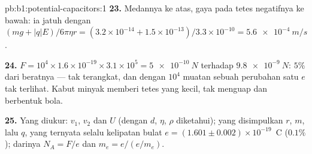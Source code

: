 \begin{solution}{pb:b1:potential-capacitors:1}
\textbf{23.} Medannya ke atas, gaya pada tetes negatifnya ke bawah: ia jatuh dengan $(mg
+ |q|E)/6\pi\eta r = (3.2 \times 10^{-14} + 1.5 \times 10^{-13})/3.3 \times 10^{-10} =
\qty{5.6e-4}{m/s}$.

\textbf{24.} $F = 10^4 \times 1.6 \times 10^{-19} \times 3.1 \times 10^5 = \qty{5e-10}{N}$
terhadap $\qty{9.8e-9}{N}$: $5\%$ dari beratnya --- tak terangkat, dan dengan
$10^4$ muatan sebuah perubahan satu $e$ tak terlihat. Kabut minyak memberi tetes
yang kecil, tak menguap dan berbentuk bola.

\textbf{25.} Yang diukur: $v_1$, $v_2$ dan $U$ (dengan $d$, $\eta$, $\rho$ diketahui);
yang disimpulkan $r$, $m$, lalu $q$, yang ternyata selalu kelipatan bulat
$e = (1.601 \pm 0.002) \times 10^{-19}$~C ($0.1\%$); darinya $N_A = F/e$ dan
$m_e = e/(e/m_e)$.
\end{solution}
